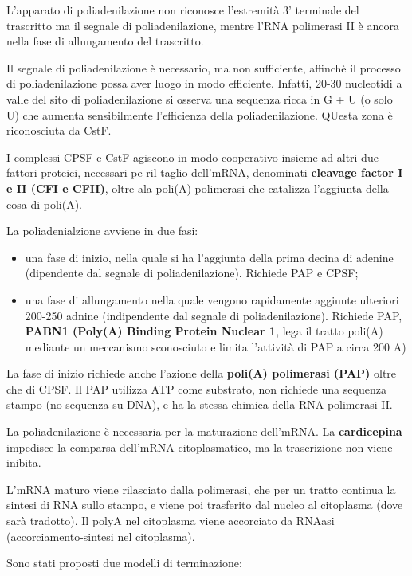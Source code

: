 \documentclass[]{article}
\begin{document}
L'apparato di poliadenilazione non riconosce l'estremità 3' terminale
del trascritto ma il segnale di poliadenilazione, mentre l'RNA
polimerasi II è ancora nella fase di allungamento del trascritto.

Il segnale di poliadenilazione è necessario, ma non sufficiente,
affinchè il processo di poliadenilazione possa aver luogo in modo
efficiente. Infatti, 20-30 nucleotidi a valle del sito di
poliadenilazione si osserva una sequenza ricca in G + U (o solo U) che
aumenta sensibilmente l'efficienza della poliadenilazione. QUesta zona è
riconosciuta da CstF.

I complessi CPSF e CstF agiscono in modo cooperativo insieme ad altri
due fattori proteici, necessari pe ril taglio dell'mRNA, denominati
\textbf{cleavage factor I e II (CFI e CFII)}, oltre ala poli(A)
polimerasi che catalizza l'aggiunta della cosa di poli(A).

La poliadenialzione avviene in due fasi:

\begin{itemize}
\itemsep1pt\parskip0pt
\item
  una fase di inizio, nella quale si ha l'aggiunta della prima decina di
  adenine (dipendente dal segnale di poliadenilazione). Richiede PAP e
  CPSF;
\item
  una fase di allungamento nella quale vengono rapidamente aggiunte
  ulteriori 200-250 adnine (indipendente dal segnale di
  poliadenilazione). Richiede PAP, \textbf{PABN1 (Poly(A) Binding
  Protein Nuclear 1}, lega il tratto poli(A) mediante un meccanismo
  sconosciuto e limita l'attività di PAP a circa 200 A)
\end{itemize}

La fase di inizio richiede anche l'azione della \textbf{poli(A)
polimerasi (PAP)} oltre che di CPSF. Il PAP utilizza ATP come substrato,
non richiede una sequenza stampo (no sequenza su DNA), e ha la stessa
chimica della RNA polimerasi II.

La poliadenilazione è necessaria per la maturazione dell'mRNA. La
\textbf{cardicepina} impedisce la comparsa dell'mRNA citoplasmatico, ma
la trascrizione non viene inibita.

L'mRNA maturo viene rilasciato dalla polimerasi, che per un tratto
continua la sintesi di RNA sullo stampo, e viene poi trasferito dal
nucleo al citoplasma (dove sarà tradotto). Il polyA nel citoplasma viene
accorciato da RNAasi (accorciamento-sintesi nel citoplasma).

Sono stati proposti due modelli di terminazione:
\end{document}
